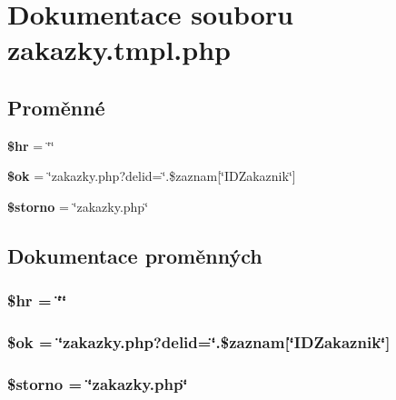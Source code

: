 \section{Dokumentace souboru zakazky.tmpl.php}
\label{zakazky_8tmpl_8php}
\subsection*{Proměnné}
\begin{CompactItemize}
\item 
{\bf \$hr} = \char`\"{}\char`\"{}
\item 
{\bf \$ok} = \char`\"{}zakazky.php?delid=\char`\"{}.\$zaznam[\char`\"{}IDZakaznik\char`\"{}]
\item 
{\bf \$storno} = \char`\"{}zakazky.php\char`\"{}
\end{CompactItemize}


\subsection{Dokumentace proměnných}
\subsubsection{\setlength{\rightskip}{0pt plus 5cm}\$hr = \char`\"{}\char`\"{}}\label{zakazky_8tmpl_8php_99b2458aa650cc08842bc2b0f8d23356}


\subsubsection{\setlength{\rightskip}{0pt plus 5cm}\$ok = \char`\"{}zakazky.php?delid=\char`\"{}.\$zaznam[\char`\"{}IDZakaznik\char`\"{}]}\label{zakazky_8tmpl_8php_012dd629d5f0d054d55d809aa87ecd33}


\subsubsection{\setlength{\rightskip}{0pt plus 5cm}\$storno = \char`\"{}zakazky.php\char`\"{}}\label{zakazky_8tmpl_8php_b080a1420e8af0c1b6c5e2841d4286b1}


